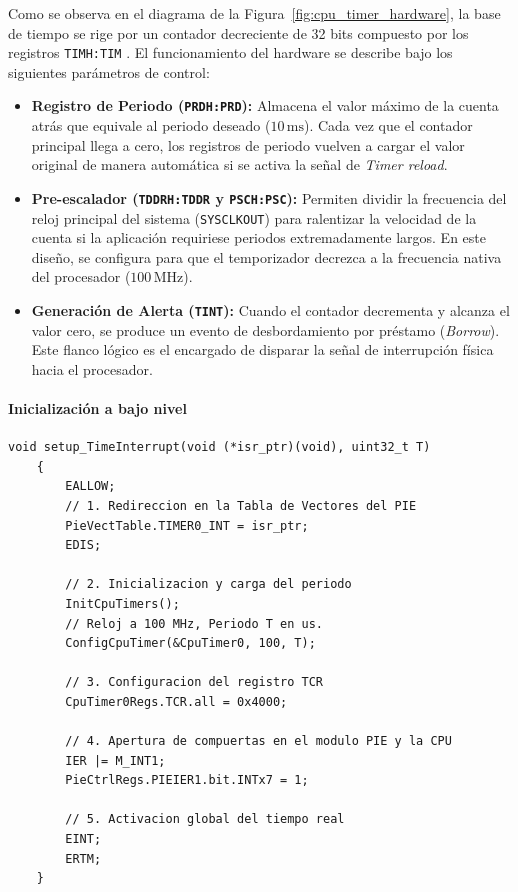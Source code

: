 \documentclass[11pt,fleqn]{book} %
\begin{document}
Como se observa en el diagrama de la Figura~\ref{fig:cpu_timer_hardware}, la base de tiempo se rige por un contador decreciente de 32 bits compuesto por los registros \texttt{TIMH:TIM} \cite{ti_f28004x_trm}. El funcionamiento del hardware se describe bajo los siguientes parámetros de control:
\begin{itemize}
	\item \textbf{Registro de Periodo (\texttt{PRDH:PRD}):} Almacena el valor máximo de la cuenta atrás que equivale al periodo deseado ($10\,\text{ms}$). Cada vez que el contador principal llega a cero, los registros de periodo vuelven a cargar el valor original de manera automática si se activa la señal de \textit{Timer reload}.
	\item \textbf{Pre-escalador (\texttt{TDDRH:TDDR} y \texttt{PSCH:PSC}):} Permiten dividir la frecuencia del reloj principal del sistema (\texttt{SYSCLKOUT}) para ralentizar la velocidad de la cuenta si la aplicación requiriese periodos extremadamente largos. En este diseño, se configura para que el temporizador decrezca a la frecuencia nativa del procesador ($100\,\text{MHz}$).
	\item \textbf{Generación de Alerta (\texttt{TINT}):} Cuando el contador decrementa y alcanza el valor cero, se produce un evento de desbordamiento por préstamo (\textit{Borrow}). Este flanco lógico es el encargado de disparar la señal de interrupción física hacia el procesador.
\end{itemize}

\newpage
\paragraph{Inicialización a bajo nivel}

\begin{lstlisting}[style=estiloC, caption={Rutina de bajo nivel para la inicialización del Timer 0}, label={code:low_level_timer}]
	void setup_TimeInterrupt(void (*isr_ptr)(void), uint32_t T)
	{
		EALLOW;
		// 1. Redireccion en la Tabla de Vectores del PIE
		PieVectTable.TIMER0_INT = isr_ptr;  
		EDIS; 
		
		// 2. Inicializacion y carga del periodo
		InitCpuTimers();
		// Reloj a 100 MHz, Periodo T en us.
		ConfigCpuTimer(&CpuTimer0, 100, T); 
		
		// 3. Configuracion del registro TCR
		CpuTimer0Regs.TCR.all = 0x4000; 
		
		// 4. Apertura de compuertas en el modulo PIE y la CPU
		IER |= M_INT1; 
		PieCtrlRegs.PIEIER1.bit.INTx7 = 1;
		
		// 5. Activacion global del tiempo real
		EINT;
		ERTM;
	}
\end{lstlisting}
\end{document}

